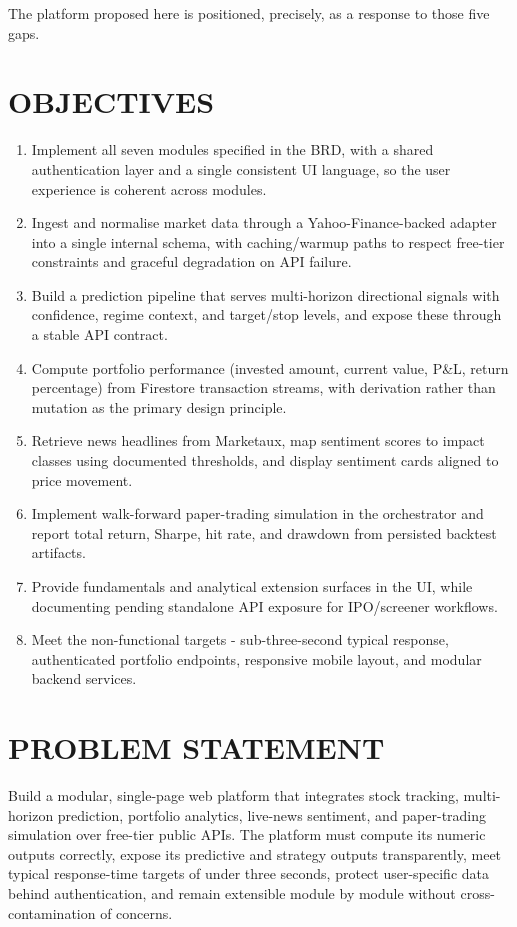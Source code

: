\documentclass[12pt,a4paper]{report}
\numberwithin{equation}{chapter}
\begin{document}
The platform proposed here is positioned, precisely, as a response to those five gaps.

\section{OBJECTIVES}

\begin{enumerate}
  \item Implement all seven modules specified in the BRD, with a shared authentication layer and a single consistent UI language, so the user experience is coherent across modules.
  \item Ingest and normalise market data through a Yahoo-Finance-backed adapter into a single internal schema, with caching/warmup paths to respect free-tier constraints and graceful degradation on API failure.
  \item Build a prediction pipeline that serves multi-horizon directional signals with confidence, regime context, and target/stop levels, and expose these through a stable API contract.
  \item Compute portfolio performance (invested amount, current value, P\&L, return percentage) from Firestore transaction streams, with derivation rather than mutation as the primary design principle.
  \item Retrieve news headlines from Marketaux, map sentiment scores to impact classes using documented thresholds, and display sentiment cards aligned to price movement.
  \item Implement walk-forward paper-trading simulation in the orchestrator and report total return, Sharpe, hit rate, and drawdown from persisted backtest artifacts.
  \item Provide fundamentals and analytical extension surfaces in the UI, while documenting pending standalone API exposure for IPO/screener workflows.
  \item Meet the non-functional targets - sub-three-second typical response, authenticated portfolio endpoints, responsive mobile layout, and modular backend services.
\end{enumerate}

\section{PROBLEM STATEMENT}

Build a modular, single-page web platform that integrates stock tracking, multi-horizon prediction, portfolio analytics, live-news sentiment, and paper-trading simulation over free-tier public APIs. The platform must compute its numeric outputs correctly, expose its predictive and strategy outputs transparently, meet typical response-time targets of under three seconds, protect user-specific data behind authentication, and remain extensible module by module without cross-contamination of concerns.
\end{document}
